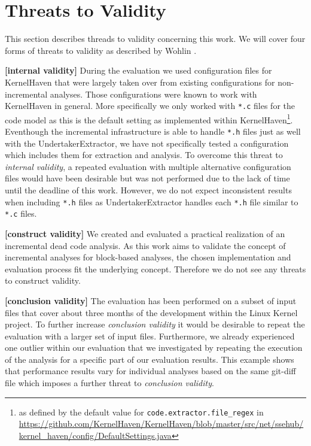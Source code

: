 \documentclass[a4paper]{article}
\begin{document}
\clearpage
\newpage

\section{Threats to Validity}\label{threats-to-validity}

This section describes threads to validity concerning this work. We will cover four forms of threats to validity as described by Wohlin \cite{Wohlin:2000:ESE:330775}. 

\textbf{[internal validity]} During the evaluation we used configuration files for KernelHaven that were largely taken over from existing configurations for non-incremental analyses. Those configurations were known to work with KernelHaven in general. More specifically we only worked with \texttt{*.c} files for the code model as this is the default setting as implemented within KernelHaven\footnote{as defined by the default value for \texttt{code.extractor.file\_regex} in \url{https://github.com/KernelHaven/KernelHaven/blob/master/src/net/ssehub/kernel_haven/config/DefaultSettings.java}}. Eventhough the incremental infrastructure is able to handle \texttt{*.h} files just as well with the UndertakerExtractor, we have not specifically tested a configuration which includes them for extraction and analysis. To overcome this threat to \emph{internal validity}, a repeated evaluation with multiple alternative configuration files would have been desirable but was not performed due to the lack of time until the deadline of this work. However, we do not expect inconsistent results when including \texttt{*.h} files as UndertakerExtractor handles each \texttt{*.h} file similar to \texttt{*.c} files.

\textbf{[construct validity]} We created and evaluated a practical realization of an incremental dead code analysis. As this work aims to validate the concept of incremental analyses for block-based analyses, the chosen implementation and evaluation process fit the underlying concept. Therefore we do not see any threats to construct validity. 

\textbf{[conclusion validity]} The evaluation has been performed on a subset of input files that cover about three months of the development within the Linux Kernel project. To further increase  \emph{conclusion validity} it would be desirable to repeat the evaluation with a larger set of input files. Furthermore, we already experienced one outlier within our evaluation that we investigated by repeating the execution of the analysis for a specific part of our evaluation results. This example shows that  performance results vary for individual analyses based on the same git-diff file which imposes a further threat to \emph{conclusion validity}.
\end{document}
